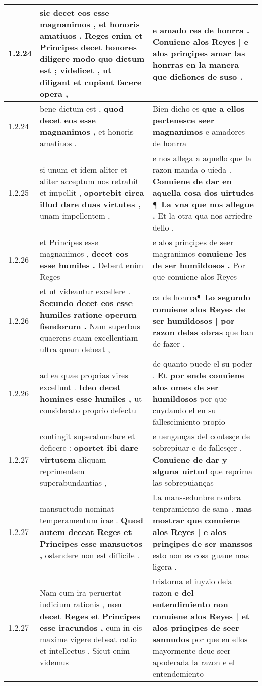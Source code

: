 \begin{tabular}{|p{1cm}|p{6.5cm}|p{6.5cm}|}
1.2.24 & sic decet eos esse magnanimos , \textbf{ et honoris amatiuos . Reges enim et Principes decet honores diligere modo quo dictum est ; } videlicet , ut diligant et cupiant facere opera , & e amado res de honrra . \textbf{ Conuiene alos Reyes | e alos prinçipes amar las honrras } en la manera que dich̃ones de suso . \\\hline
1.2.24 & bene dictum est , \textbf{ quod decet eos esse magnanimos , } et honoris amatiuos . & Bien dicho es \textbf{ que a ellos pertenesce seer magnanimos } e amadores de honrra \\\hline
1.2.25 & si unum et idem aliter et aliter acceptum nos retrahit et impellit , \textbf{ oportebit circa illud dare duas virtutes , } unam impellentem , & e nos allega a aquello que la razon manda o uieda . \textbf{ Conuiene de dar en aquella cosa dos uirtudes ¶ La vna que nos allegue . } Et la otra qua nos arriedre dello . \\\hline
1.2.26 & et Principes esse magnanimos , \textbf{ decet eos esse humiles . } Debent enim Reges & e alos prinçipes de seer magranimos \textbf{ conuiene les de ser humildosos . } Por que conuiene alos Reyes \\\hline
1.2.26 & et ut videantur excellere . \textbf{ Secundo decet eos esse humiles ratione operum fiendorum . } Nam superbus quaerens suam excellentiam ultra quam debeat , & ca de honrra¶ \textbf{ Lo segundo conuiene alos Reyes de ser humildosos | por razon delas obras } que han de fazer . \\\hline
1.2.26 & ad ea quae proprias vires excellunt . \textbf{ Ideo decet homines esse humiles , } ut considerato proprio defectu & de quanto puede el su poder . \textbf{ Et por ende conuiene alos omes de ser humildosos } por que cuydando el en su fallescimiento propio \\\hline
1.2.27 & contingit superabundare et deficere : \textbf{ oportet ibi dare virtutem } aliquam reprimentem superabundantias , & e uenganças del contesçe de sobrepiuar e de fallesçer . \textbf{ Conuiene de dar y alguna uirtud } que reprima las sobrepuianças \\\hline
1.2.27 & mansuetudo nominat temperamentum irae . \textbf{ Quod autem deceat Reges et Principes esse mansuetos , } ostendere non est difficile . & La manssedunbre nonbra tenpramiento de sana . \textbf{ mas mostrar que conuiene alos Reyes | e alos prinçipes de ser manssos } esto non es cosa guaue mas ligera . \\\hline
1.2.27 & Nam cum ira peruertat iudicium rationis , \textbf{ non decet Reges et Principes esse iracundos , } cum in eis maxime vigere debeat ratio et intellectus . Sicut enim videmus & tristorna el iuyzio dela razon \textbf{ e del entendimiento non conuiene alos Reyes | et alos prinçipes de seer sannudos } por que en ellos mayormente deue seer apoderada la razon e el entendemiento \\\hline

\end{tabular}
